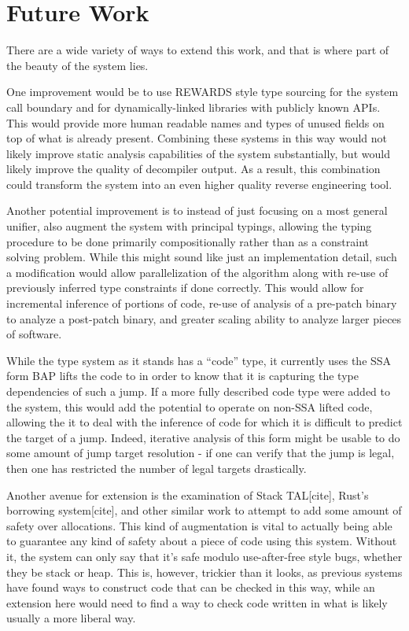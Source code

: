 \section{Future Work}
There are a wide variety of ways to extend this work, and that is where part of the beauty of the system lies. %

One improvement would be to use REWARDS style type sourcing for the system call boundary and for dynamically-linked libraries with publicly known APIs. This would provide more human readable names and types of unused fields on top of what is already present. Combining these systems in this way would not likely improve static analysis capabilities of the system substantially, but would likely improve the quality of decompiler output. As a result, this combination could transform the system into an even higher quality reverse engineering tool.

Another potential improvement is to instead of just focusing on a most general unifier, also augment the system with principal typings, allowing the typing procedure to be done primarily compositionally rather than as a constraint solving problem. While this might sound like just an implementation detail, such a modification would allow parallelization of the algorithm along with re-use of previously inferred type constraints if done correctly. This would allow for incremental inference of portions of code, re-use of analysis of a pre-patch binary to analyze a post-patch binary, and greater scaling ability to analyze larger pieces of software.

While the type system as it stands has a ``code'' type, it currently uses the SSA form BAP lifts the code to in order to know that it is capturing the type dependencies of such a jump. If a more fully described code type were added to the system, this would add the potential to operate on non-SSA lifted code, allowing the it to deal with the inference of code for which it is difficult to predict the target of a jump. Indeed, iterative analysis of this form might be usable to do some amount of jump target resolution - if one can verify that the jump is legal, then one has restricted the number of legal targets drastically.

Another avenue for extension is the examination of Stack TAL[cite], Rust's borrowing system[cite], and other similar work to attempt to add some amount of safety over allocations. This kind of augmentation is vital to actually being able to guarantee any kind of safety about a piece of code using this system. Without it, the system can only say that it's safe modulo use-after-free style bugs, whether they be stack or heap. This is, however, trickier than it looks, as previous systems have found ways to construct code that can be checked in this way, while an extension here would need to find a way to check code written in what is likely usually a more liberal way.

